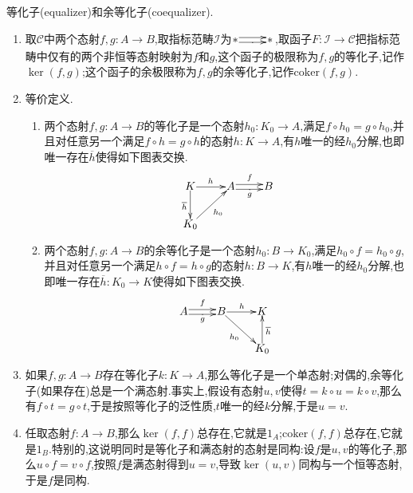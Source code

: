 等化子(equalizer)和余等化子(coequalizer).
\begin{enumerate}
	\item 取$\mathscr{C}$中两个态射$f,g:A\to B$,取指标范畴$\mathscr{I}$为$\xymatrix@1{\ast\ar@<0.5ex>[r]_ {\cdot}\ar@<-0.5ex>[r]&\ast}$,取函子$F:\mathscr{I}\to\mathscr{C}$把指标范畴中仅有的两个非恒等态射映射为$f$和$g$,这个函子的极限称为$f,g$的等化子,记作$\ker(f,g)$;这个函子的余极限称为$f,g$的余等化子,记作$\mathrm{coker}(f,g)$.
	\item 等价定义.
	\begin{enumerate}
		\item 两个态射$f,g:A\to B$的等化子是一个态射$h_0:K_0\to A$,满足$f\circ h_0=g\circ h_0$,并且对任意另一个满足$f\circ h=g\circ h$的态射$h:K\to A$,有$h$唯一的经$h_0$分解,也即唯一存在$\overline{h}$使得如下图表交换.
		$$\xymatrix@1{K\ar[r]^h\ar[d]_{\overline{h}}&A\ar@<0.5ex>[r]_{\cdot}^f\ar@<-0.5ex>[r]_g&B\\K_0\ar[ur]_{h_0}&&}$$
		\item 两个态射$f,g:A\to B$的余等化子是一个态射$h_0:B\to K_0$,满足$h_0\circ f=h_0\circ g$,并且对任意另一个满足$h\circ f=h\circ g$的态射$h:B\to K$,有$h$唯一的经$h_0$分解,也即唯一存在$\overline{h}:K_0\to K$使得如下图表交换.
		$$\xymatrix@1{A\ar@<0.5ex>[r]_{\cdot}^f\ar@<-0.5ex>[r]_g&B\ar[r]^h\ar[dr]_{h_0}&K\\&&K_0\ar[u]_{\overline{h}}}$$
	\end{enumerate}
    \item 如果$f,g:A\to B$存在等化子$k:K\to A$,那么等化子是一个单态射;对偶的,余等化子(如果存在)总是一个满态射.事实上,假设有态射$u,v$使得$t=k\circ u=k\circ v$,那么有$f\circ t=g\circ t$,于是按照等化子的泛性质,$t$唯一的经$k$分解,于是$u=v$.
    \item 任取态射$f:A\to B$,那么$\ker(f,f)$总存在,它就是$1_A$;$\mathrm{coker}(f,f)$总存在,它就是$1_B$.特别的,这说明同时是等化子和满态射的态射是同构:设$f$是$u,v$的等化子,那么$u\circ f=v\circ f$,按照$f$是满态射得到$u=v$,导致$\ker(u,v)$同构与一个恒等态射,于是$f$是同构.
\end{enumerate}

